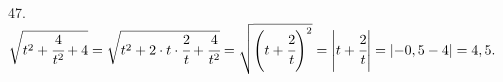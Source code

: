 47. $\sqrt{t^2+\cfrac{4}{t^2}+4}=\sqrt{t^2+2\cdot t\cdot\cfrac{2}{t}+\cfrac{4}{t^2}}=\sqrt{\left(t+\cfrac{2}{t}\right)^2}=\left|t+\cfrac{2}{t}\right|=\left|-0,5-4\right|=4,5.$\\
